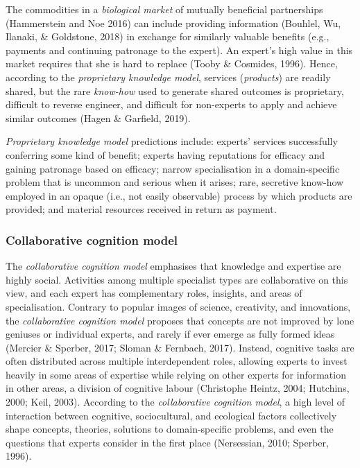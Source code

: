 \documentclass[
  11pt,
]{article}
\begin{document}
The commodities in a \emph{biological market} of mutually beneficial partnerships (Hammerstein and Noe 2016) can include providing information (Bouhlel, Wu, Ilanaki, \& Goldstone, 2018) in exchange for similarly valuable benefits (e.g., payments and continuing patronage to the expert). An expert's high value in this market requires that she is hard to replace (Tooby \& Cosmides, 1996). Hence, according to the \emph{proprietary knowledge model}, services (\emph{products}) are readily shared, but the rare \emph{know-how} used to generate shared outcomes is proprietary, difficult to reverse engineer, and difficult for non-experts to apply and achieve similar outcomes (Hagen \& Garfield, 2019).

\emph{Proprietary knowledge model} predictions include: experts' services successfully conferring some kind of benefit; experts having reputations for efficacy and gaining patronage based on efficacy; narrow specialisation in a domain-specific problem that is uncommon and serious when it arises; rare, secretive know-how employed in an opaque (i.e., not easily observable) process by which products are provided; and material resources received in return as payment.

\hypertarget{collaborative-cognition-model}{%
\subsubsection{Collaborative cognition model}\label{collaborative-cognition-model}}

The \emph{collaborative cognition model} emphasises that knowledge and expertise are highly social. Activities among multiple specialist types are collaborative on this view, and each expert has complementary roles, insights, and areas of specialisation. Contrary to popular images of science, creativity, and innovations, the \emph{collaborative cognition model} proposes that concepts are not improved by lone geniuses or individual experts, and rarely if ever emerge as fully formed ideas (Mercier \& Sperber, 2017; Sloman \& Fernbach, 2017). Instead, cognitive tasks are often distributed across multiple interdependent roles, allowing experts to invest heavily in some areas of expertise while relying on other experts for information in other areas, a division of cognitive labour (Christophe Heintz, 2004; Hutchins, 2000; Keil, 2003). According to the \emph{collaborative cognition model}, a high level of interaction between cognitive, sociocultural, and ecological factors collectively shape concepts, theories, solutions to domain-specific problems, and even the questions that experts consider in the first place (Nersessian, 2010; Sperber, 1996).
\end{document}
